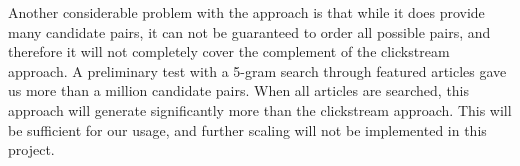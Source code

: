 
Another considerable problem with the approach is that while it does provide many candidate pairs, it can not be guaranteed to order all possible pairs, and therefore it will not completely cover the complement of the clickstream approach. A preliminary test with a 5-gram search through featured articles gave us more than a million candidate pairs. When all articles are searched, this approach will generate significantly more than the clickstream approach. This will be sufficient for our usage, and further scaling will not be implemented in this project.


